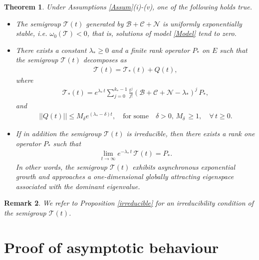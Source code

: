 \documentclass[12pt,a4paper]{amsart}
\newtheorem{theorem}{Theorem}[section]
\newtheorem{remark}[theorem]{Remark}
\begin{document}
\begin{theorem}\label{mainresult}
Under Assumptions \ref{Assum}(i)-(v), one of the following holds true.
\begin{itemize}
\item[(i)] The semigroup $\mathcal{T}(t)$ generated by $\mathcal{B}+\mathcal{C}+\mathcal{N}$ is uniformly exponentially stable, 
i.e. $\omega_0(\mathcal{T})<0$, that is, solutions of model \eqref{Model} tend to zero.
\item[(ii)] There exists a constant $\lambda_*\ge 0$  and a finite rank operator $P_*$ on $E$ such that the semigroup $\mathcal{T}(t)$ decomposes as
    \begin{align*}
    \mathcal{T}(t)=\mathcal{T}_*(t) + Q(t),
    \end{align*}
where
    \begin{align*}
    \mathcal{T}_*(t)=e^{\lambda_*\, t}\sum_{j=0}^{k_*-1}\frac{t^j}{j!}\left(\mathcal{B}+\mathcal{C}+\mathcal{N}-\lambda_*\right)^j\, P_*,
    \end{align*}
and
    \begin{align*}
    ||Q(t)||\le M_\delta e^{(\lambda_*-\delta) t},\quad \text{for some}\quad \delta>0,\, M_\delta\,\ge 1,\quad \forall\, t\ge 0.
    \end{align*}
\item[(iii)]
If in addition the semigroup $\mathcal{T}(t)$ is irreducible, then there exists a rank one operator $P_*$ such that
    \begin{align*}
    \displaystyle\lim_{t\to \infty} e^{-\lambda_*\,t}\,\mathcal{T}(t)=P_*.
    \end{align*}
In other words, the semigroup $\mathcal{T}(t)$ exhibits asynchronous exponential growth and approaches a one-dimensional globally attracting eigenspace associated with the dominant eigenvalue.
\end{itemize}
\end{theorem}


\begin{remark}
We refer to Proposition \ref{irreducible} for an irreducibility condition of the semigroup $\mathcal{T}(t)$.
\end{remark}

\section{Proof of asymptotic behaviour}
\label{section:asymptotic_proof}
\noindent
\end{document}
